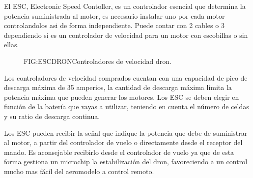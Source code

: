 
 El ESC, Electronic Speed Contoller, es un controlador esencial que determina la potencia suministrada al motor, es necesario instalar uno por cada motor controlandolos asi de forma independiente. 
 Puede contar con 2 cables o 3 dependiendo si es un controlador de velocidad para un motor con escobillas o sin ellas.
 
 \begin{figure}{FIG:ESCDRON}{Controladores de velocidad dron.}
\end{figure}
 
 Los controladores de velocidad comprados cuentan con una capacidad de pico de descarga máxima de 35 amperios, la cantidad de descarga máxima limita la potencia máxima que pueden generar los motores. Los ESC se deben elegir en función de la batería que vayas a utilizar, teniendo en cuenta el número de celdas y su ratio de descarga continua.
 
 Los ESC pueden recibir la señal que indique la potencia que debe de suministrar al motor, a partir del controlador de vuelo o directamente desde el receptor del mando. Es aconsejable recibirlo desde el controlador de vuelo ya que de esta forma gestiona un microchip la estabilización del dron, favoreciendo a un control mucho mas fácil del aeromodelo a control remoto.\cite{OscarSerrano}

 